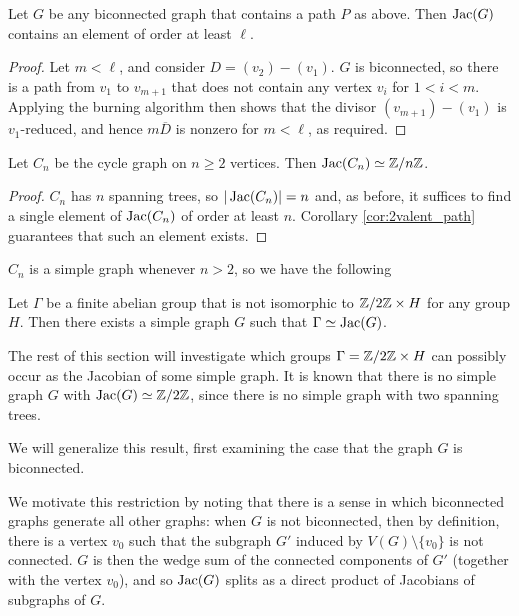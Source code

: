 \documentclass{amsart}
\begin{document}
\begin{cor}
  \label{cor:2valent_path}
  Let $G$ be any biconnected graph that contains a path $P$ as
  above. Then $\operatorname{Jac}(G)$ contains an element of order at least $\ell$.
\end{cor}
\begin{proof}
  Let $m < \ell$, and consider $D = (v_2) - (v_1)$. $G$ is
  biconnected, so there is a path from $v_1$ to $v_{m+1}$ that does
  not contain any vertex $v_i$ for $1 < i < m$. Applying the burning
  algorithm then shows that the divisor $(v_{m+1}) - (v_1)$ is
  $v_1$-reduced, and hence $m\overline{D}$ is nonzero for $m < \ell$,
  as required.
\end{proof}

\begin{cor}
  \label{prop:cycle_cyclic}
  Let $C_n$ be the cycle graph on $n \ge 2$ vertices. Then $\operatorname{Jac}(C_n) \simeq
  \mathbb{Z}/n\mathbb{Z}$.
\end{cor}
\begin{proof}
$C_n$ has $n$ spanning trees, so $|\operatorname{Jac}(C_n)|=n$ and, as before, it
suffices to find a single element of $\operatorname{Jac}(C_n)$ of order at least
$n$. Corollary \ref{cor:2valent_path} guarantees that such an element
exists.
\end{proof}

$C_n$ is a simple graph whenever $n > 2$, so we have the following

\begin{cor}
  Let $\Gamma$ be a finite abelian group that is not isomorphic to
  $\mathbb{Z}/2\mathbb{Z} \times H$ for any group $H$. Then there exists a simple
  graph $G$ such that $\Gamma \simeq \operatorname{Jac}(G)$.
\end{cor}

The rest of this section will investigate which groups $\Gamma =
\mathbb{Z}/2\mathbb{Z} \times H$ can possibly occur as the Jacobian of some simple
graph. It is known that there is no simple graph $G$ with $\operatorname{Jac}(G)
\simeq \mathbb{Z}/2\mathbb{Z}$, since there is no simple graph with two spanning
trees. 

We will generalize this result, first examining the case that the
graph $G$ is biconnected. 

\begin{remark}
  \label{remark:biconnected_wedge}
  We motivate this restriction by noting that there is a sense in
  which biconnected graphs generate all other graphs: when $G$ is not
  biconnected, then by definition, there is a vertex $v_0$ such that
  the subgraph $G'$ induced by $V(G) \setminus \{v_0\}$ is not
  connected. $G$ is then the wedge sum of the connected components of
  $G'$ (together with the vertex $v_0$), and so $\operatorname{Jac}(G)$ splits as a
  direct product of Jacobians of subgraphs of $G$.
\end{remark}
\end{document}
